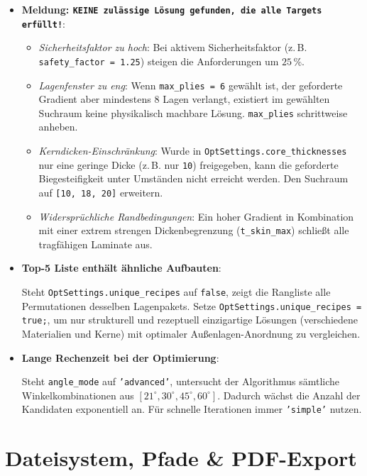 \begin{itemize}
    \item \textbf{Meldung: \texttt{KEINE zulässige Lösung gefunden, die alle Targets erfüllt!}}:
    \begin{itemize}
        \item \textit{Sicherheitsfaktor zu hoch}: Bei aktivem Sicherheitsfaktor (z.\,B. \texttt{safety\_factor = 1.25}) steigen die Anforderungen um $25\,\%$.
        \item \textit{Lagenfenster zu eng}: Wenn \texttt{max\_plies = 6} gewählt ist, der geforderte Gradient aber mindestens 8 Lagen verlangt, existiert im gewählten Suchraum keine physikalisch machbare Lösung. \texttt{max\_plies} schrittweise anheben.
        \item \textit{Kerndicken-Einschränkung}: Wurde in \texttt{OptSettings.core\_thicknesses} nur eine geringe Dicke (z.\,B. nur \texttt{10}) freigegeben, kann die geforderte Biegesteifigkeit unter Umständen nicht erreicht werden. Den Suchraum auf \texttt{[10, 18, 20]} erweitern.
        \item \textit{Widersprüchliche Randbedingungen}: Ein hoher Gradient in Kombination mit einer extrem strengen Dickenbegrenzung (\texttt{t\_skin\_max}) schließt alle tragfähigen Laminate aus.
    \end{itemize}

    \item \textbf{Top-5 Liste enthält ähnliche Aufbauten}: \par
    Steht \texttt{OptSettings.unique\_recipes} auf \texttt{false}, zeigt die Rangliste alle Permutationen desselben Lagenpakets. Setze \texttt{OptSettings.unique\_recipes = true;}, um nur strukturell und rezeptuell einzigartige Lösungen (verschiedene Materialien und Kerne) mit optimaler Außenlagen-Anordnung zu vergleichen.

    \item \textbf{Lange Rechenzeit bei der Optimierung}: \par
    Steht \texttt{angle\_mode} auf \texttt{'advanced'}, untersucht der Algorithmus sämtliche Winkelkombinationen aus $[21^\circ, 30^\circ, 45^\circ, 60^\circ]$. Dadurch wächst die Anzahl der Kandidaten exponentiell an. Für schnelle Iterationen immer \texttt{'simple'} nutzen.
\end{itemize}

\section{Dateisystem, Pfade \& PDF-Export} \label{sec:ts_export}

